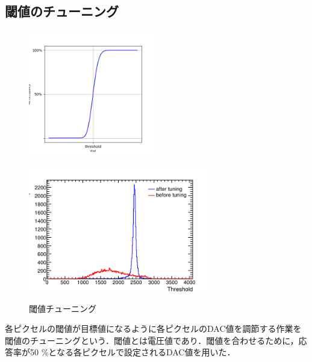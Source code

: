\subsection{閾値のチューニング}
\begin{figure}[h]
  \centering
  \begin{minipage}[b]{0.35\linewidth}
    \centering
    \includegraphics[width=5.5cm]{./figure/scurve2.png}
    \label{fig:scurve}
  \end{minipage}
  \begin{minipage}[b]{0.6\linewidth}
    \centering
    \includegraphics[width=8cm]{./figure/ThreDiff.png}
    \label{fig:ThrDistBefore}
  \end{minipage}
  \caption{閾値チューニング}
\end{figure}

各ピクセルの閾値が目標値になるように各ピクセルのDAC値を調節する作業を閾値のチューニングという．閾値とは電圧値であり．閾値を合わせるために，応答率が50 $\mathrm{\%}$となる各ピクセルで設定されるDAC値を用いた．

